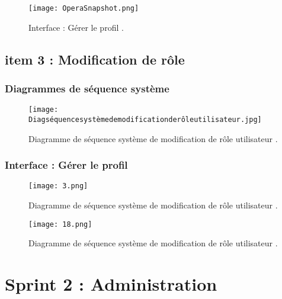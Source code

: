 \begin{figure}[ht]
	\centering
	\texttt{[image: OperaSnapshot.png]}
	\caption{Interface : Gérer le profil .}
	\label{fig:Interface : Gérer le profil }
\end{figure}
\FloatBarrier










\clearpage
\subsection{item 3 : Modification de rôle}
\subsubsection{Diagrammes de séquence système }


\begin{figure}[ht]
	\centering
	\texttt{[image: Diagséquencesystèmedemodificationderôleutilisateur.jpg]}
	\caption{Diagramme de séquence système de modification de rôle utilisateur .}
	\label{fig:Diagramme de séquence système de modification de rôle utilisateur }
\end{figure}
\FloatBarrier
\clearpage
\subsubsection{ Interface : Gérer le profil  }
\begin{figure}[ht]
	\centering
	\texttt{[image: 3.png]}
	\caption{Diagramme de séquence système de modification de rôle utilisateur .}
	\label{fig:Diagramme de séquence système de modification de rôle utilisateur }
\end{figure}
\FloatBarrier
\begin{figure}[ht]
	\centering
	\texttt{[image: 18.png]}
	\caption{Diagramme de séquence système de modification de rôle utilisateur .}
	\label{fig:Diagramme de séquence système de modification de rôle utilisateur }
\end{figure}
\FloatBarrier
\clearpage



\section{Sprint 2 : Administration }



